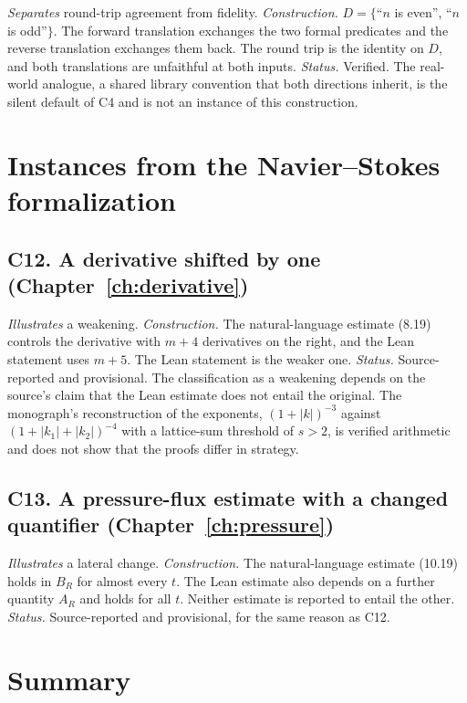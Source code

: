 \emph{Separates} round-trip agreement from fidelity. \emph{Construction.} $D=\{$``$n$ is even'', ``$n$ is odd''$\}$. The forward translation exchanges the two formal predicates and the reverse translation exchanges them back. The round trip is the identity on $D$, and both translations are unfaithful at both inputs. \emph{Status.} Verified. The real-world analogue, a shared library convention that both directions inherit, is the silent default of C4 and is not an instance of this construction.

\section{Instances from the Navier--Stokes formalization}

\subsection*{C12. A derivative shifted by one (Chapter~\ref{ch:derivative})}

\emph{Illustrates} a weakening. \emph{Construction.} The natural-language estimate (8.19) controls the derivative with $m+4$ derivatives on the right, and the Lean statement uses $m+5$. The Lean statement is the weaker one. \emph{Status.} Source-reported and provisional. The classification as a weakening depends on the source's claim that the Lean estimate does not entail the original. The monograph's reconstruction of the exponents, $(1+|k|)^{-3}$ against $(1+|k_1|+|k_2|)^{-4}$ with a lattice-sum threshold of $s>2$, is verified arithmetic and does not show that the proofs differ in strategy.

\subsection*{C13. A pressure-flux estimate with a changed quantifier (Chapter~\ref{ch:pressure})}

\emph{Illustrates} a lateral change. \emph{Construction.} The natural-language estimate (10.19) holds in $B_R$ for almost every $t$. The Lean estimate also depends on a further quantity $A_R$ and holds for all $t$. Neither estimate is reported to entail the other. \emph{Status.} Source-reported and provisional, for the same reason as C12.

\section{Summary}

